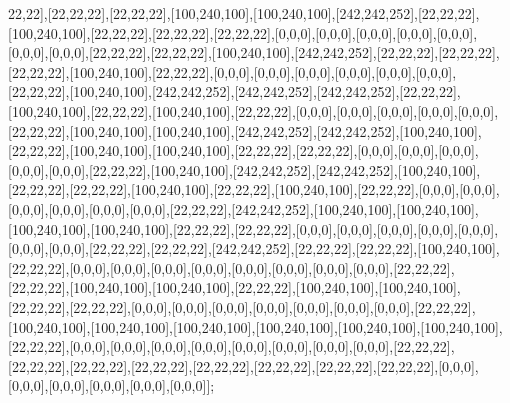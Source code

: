 22,22],[22,22,22],[22,22,22],[100,240,100],[100,240,100],[242,242,252],[22,22,22],[100,240,100],[22,22,22],[22,22,22],[22,22,22],[0,0,0],[0,0,0],[0,0,0],[0,0,0],[0,0,0],[0,0,0],[0,0,0],[22,22,22],[22,22,22],[100,240,100],[242,242,252],[22,22,22],[22,22,22],[22,22,22],[100,240,100],[22,22,22],[0,0,0],[0,0,0],[0,0,0],[0,0,0],[0,0,0],[0,0,0],[22,22,22],[100,240,100],[242,242,252],[242,242,252],[242,242,252],[22,22,22],[100,240,100],[22,22,22],[100,240,100],[22,22,22],[0,0,0],[0,0,0],[0,0,0],[0,0,0],[0,0,0],[22,22,22],[100,240,100],[100,240,100],[242,242,252],[242,242,252],[100,240,100],[22,22,22],[100,240,100],[100,240,100],[22,22,22],[22,22,22],[0,0,0],[0,0,0],[0,0,0],[0,0,0],[0,0,0],[22,22,22],[100,240,100],[242,242,252],[242,242,252],[100,240,100],[22,22,22],[22,22,22],[100,240,100],[22,22,22],[100,240,100],[22,22,22],[0,0,0],[0,0,0],[0,0,0],[0,0,0],[0,0,0],[0,0,0],[22,22,22],[242,242,252],[100,240,100],[100,240,100],[100,240,100],[100,240,100],[22,22,22],[22,22,22],[0,0,0],[0,0,0],[0,0,0],[0,0,0],[0,0,0],[0,0,0],[0,0,0],[22,22,22],[22,22,22],[242,242,252],[22,22,22],[22,22,22],[100,240,100],[22,22,22],[0,0,0],[0,0,0],[0,0,0],[0,0,0],[0,0,0],[0,0,0],[0,0,0],[0,0,0],[22,22,22],[22,22,22],[100,240,100],[100,240,100],[22,22,22],[100,240,100],[100,240,100],[22,22,22],[22,22,22],[0,0,0],[0,0,0],[0,0,0],[0,0,0],[0,0,0],[0,0,0],[0,0,0],[22,22,22],[100,240,100],[100,240,100],[100,240,100],[100,240,100],[100,240,100],[100,240,100],[22,22,22],[0,0,0],[0,0,0],[0,0,0],[0,0,0],[0,0,0],[0,0,0],[0,0,0],[0,0,0],[22,22,22],[22,22,22],[22,22,22],[22,22,22],[22,22,22],[22,22,22],[22,22,22],[22,22,22],[0,0,0],[0,0,0],[0,0,0],[0,0,0],[0,0,0],[0,0,0]];

